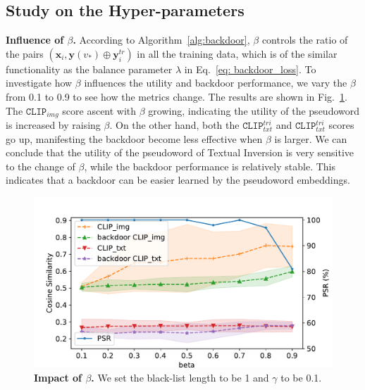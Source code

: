 \subsection{Study on the Hyper-parameters}
\label{subsec:hyper-parameters}
\noindent \textbf{Influence of $\beta$.} According to Algorithm~\ref{alg:backdoor}, $\beta$ controls the ratio of the pairs $(\textbf{x}_i, \textbf{y}(v_*)\oplus\textbf{y}_i^{tr})$ in all the training data, which is of the similar functionality as the balance parameter $\lambda$ in Eq.~\ref{eq: backdoor_loss}. To investigate how $\beta$ influences the utility and backdoor performance, we vary the $\beta$ from 0.1 to 0.9 to see how the metrics change. The results are shown in Fig.~\ref{fig:beta}. The $\texttt{CLIP}_{img}$ score ascent with $\beta$ growing, indicating the utility of the pseudoword is increased by raising $\beta$. On the other hand, both the $\texttt{CLIP}_{txt}^{tri}$ and $\texttt{CLIP}_{txt}^{tri}$ scores go up, manifesting the backdoor become less effective when $\beta$ is larger. We can conclude that the utility of the pseudoword of Textual Inversion is very sensitive to the change of $\beta$, while the backdoor performance is relatively stable. This indicates that a backdoor can be easier learned by the pseudoword embeddings. 

\begin{figure}
    \centering 
    \includegraphics[width=\linewidth]{images/beta.pdf}
    \caption{\textbf{Impact of $\beta$.} We set the black-list length to be 1 and $\gamma$ to be 0.1.}
    \label{fig:beta}
\end{figure}

